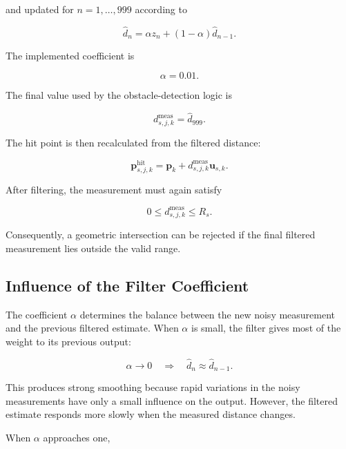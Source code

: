 \documentclass[10pt,twocolumn,a4paper]{article}
\begin{document}
and updated for $n=1,\ldots,999$ according to

\begin{equation}
    \hat{d}_n
    =
    \alpha z_n+(1-\alpha)\hat{d}_{n-1}.
    \label{eq:ema_filter}
\end{equation}

The implemented coefficient is

\[
    \alpha=0.01.
\]

The final value used by the obstacle-detection logic is

\begin{equation}
    d^{\mathrm{meas}}_{s,j,k}=\hat{d}_{999}.
    \label{eq:final_filtered_measurement}
\end{equation}

The hit point is then recalculated from the filtered distance:

\begin{equation}
    \mathbf{p}^{\mathrm{hit}}_{s,j,k}
    =
    \mathbf{p}_k
    +d^{\mathrm{meas}}_{s,j,k}\mathbf{u}_{s,k}.
    \label{eq:filtered_hit_point}
\end{equation}

After filtering, the measurement must again satisfy

\begin{equation}
    0\leq d^{\mathrm{meas}}_{s,j,k}\leq R_s.
    \label{eq:filtered_range_validation}
\end{equation}

Consequently, a geometric intersection can be rejected if the final
filtered measurement lies outside the valid range.

\subsection{Influence of the Filter Coefficient}

The coefficient $\alpha$ determines the balance between the new noisy
measurement and the previous filtered estimate. When $\alpha$ is small,
the filter gives most of the weight to its previous output:

\[
    \alpha \rightarrow 0
    \quad\Rightarrow\quad
    \hat{d}_n \approx \hat{d}_{n-1}.
\]

This produces strong smoothing because rapid variations in the noisy
measurements have only a small influence on the output. However, the
filtered estimate responds more slowly when the measured distance
changes.

When $\alpha$ approaches one,
\end{document}
